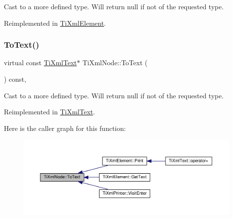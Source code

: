 Cast to a more defined type. Will return null if not of the requested type. 



Reimplemented in \hyperlink{class_ti_xml_element_a9def86337ea7a755eb41cac980f60c7a}{Ti\+Xml\+Element}.

\mbox{\label{class_ti_xml_node_a2591700660b308571c09166559a39332}} 
\subsubsection{\texorpdfstring{To\+Text()}{ToText()}\hspace{0.1cm}{\footnotesize\ttfamily [1/2]}}
{\footnotesize\ttfamily virtual const \hyperlink{class_ti_xml_text}{Ti\+Xml\+Text}$\ast$ Ti\+Xml\+Node\+::\+To\+Text (\begin{DoxyParamCaption}{ }\end{DoxyParamCaption}) const\hspace{0.3cm}{\ttfamily [inline]}, {\ttfamily [virtual]}}



Cast to a more defined type. Will return null if not of the requested type. 



Reimplemented in \hyperlink{class_ti_xml_text_af8973cfd4ca00c5d934cb23e8aa0f5d5}{Ti\+Xml\+Text}.

Here is the caller graph for this function\+:
\nopagebreak
\begin{figure}[H]
\begin{center}
\leavevmode
\includegraphics[width=350pt]{class_ti_xml_node_a2591700660b308571c09166559a39332_icgraph}
\end{center}
\end{figure}
\mbox{\label{class_ti_xml_node_a3ddfbcac78fbea041fad57e5c6d60a03}} 
